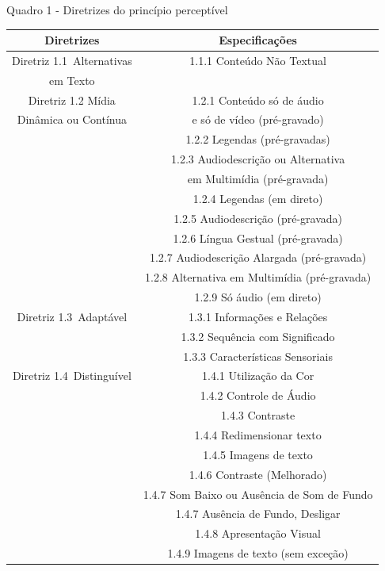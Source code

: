 \documentclass[a4paper]{article}
\begin{document}
\begin{titlepage}
Quadro 1 - Diretrizes do princípio perceptível\\[-1cm]
\begin{center}
	\fontsize{8pt}{8pt}\selectfont
	\begin{longtable}{|c|c|}
		\hline
		Diretrizes & Especificações \\
		\hline
		Diretriz 1.1 Alternativas& 1.1.1 Conteúdo Não Textual\\
		em Texto & \\
		\hline
		Diretriz 1.2 Mídia & 1.2.1 Conteúdo só de áudio\\
		Dinâmica ou Contínua & e só de vídeo (pré-gravado) \\
		& 1.2.2 Legendas (pré-gravadas)\\
		& 1.2.3 Audiodescrição ou Alternativa\\
		& em Multimídia (pré-gravada)\\
		& 1.2.4 Legendas (em direto)\\
		& 1.2.5 Audiodescrição (pré-gravada)\\
		& 1.2.6 Língua Gestual (pré-gravada)\\
		& 1.2.7 Audiodescrição Alargada (pré-gravada)\\
		& 1.2.8 Alternativa em Multimídia (pré-gravada)\\
		& 1.2.9 Só áudio (em direto)\\
		\hline
		Diretriz 1.3 Adaptável& 1.3.1 Informações e Relações\\
		& 1.3.2 Sequência com Significado\\
		& 1.3.3 Características Sensoriais\\
		\hline
		Diretriz 1.4 Distinguível& 1.4.1 Utilização da Cor\\
		& 1.4.2 Controle de Áudio\\
		& 1.4.3 Contraste\\
		& 1.4.4 Redimensionar texto\\
		& 1.4.5 Imagens de texto\\
		& 1.4.6 Contraste (Melhorado)\\
		& 1.4.7 Som Baixo ou Ausência de Som de Fundo\\
		& 1.4.7 Ausência de Fundo, Desligar\\
		& 1.4.8 Apresentação Visual\\
		& 1.4.9 Imagens de texto (sem exceção)\\
		\hline
	\end{longtable}
\end{center}


\end{titlepage}
\end{document}
